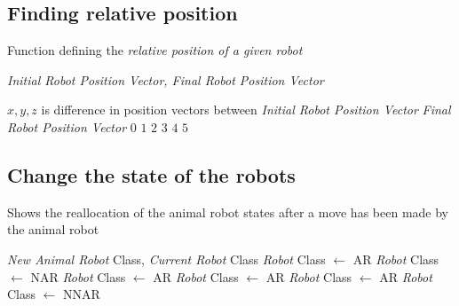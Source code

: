 \subsection{Finding relative position}
\label{function:def_relative_position}
\begin{algorithm}[H]
\caption{Function defining the \textit{relative position of a given robot}}
 \begin{algorithmic}
 \REQUIRE \textit{Initial Robot Position Vector, Final Robot Position Vector}
 
 $x, y, z$ is difference in position vectors between \textit{Initial Robot Position Vector} \AND \textit{Final Robot Position Vector}
    \RETURN {}
    \RETURN $0$
    \RETURN $1$
    \RETURN $2$
    \RETURN $3$   
    \RETURN $4$  
    \RETURN $5$  
\ENDIF

 \end{algorithmic}
\end{algorithm}

\subsection{Change the state of the robots}
\label{function:change_AR_state}
\begin{algorithm}[H]
\caption{Shows the reallocation of the animal robot states after a move has been made by the animal robot}
\begin{algorithmic}
\REQUIRE \textit{New Animal Robot} Class, \textit{Current Robot} Class
\STATE    
{}
\STATEtunr
{}
    \STATE \textit{Robot} Class $\leftarrow$ AR
    \STATE \textit{Robot} Class $\leftarrow$ NAR
\STATE    
{}
    \STATE \textit{Robot} Class $\leftarrow$ AR
    \STATE \textit{Robot} Class $\leftarrow$ AR
\STATE    
{}
    \STATE \textit{Robot} Class $\leftarrow$ AR
    \STATE \textit{Robot} Class $\leftarrow$ NNAR
    
    
\ENDIF
\ENDFOR

\end{algorithmic}



\end{algorithm}

